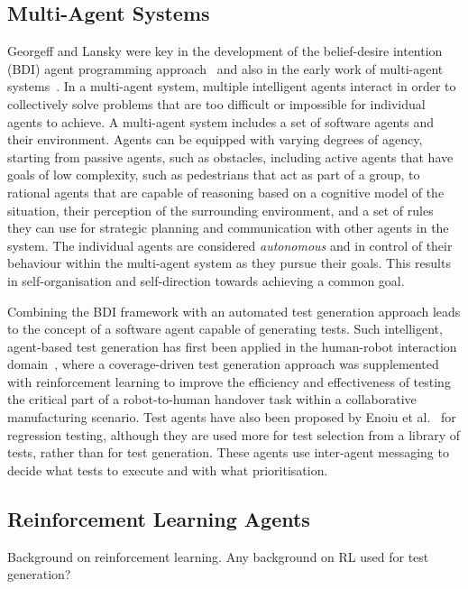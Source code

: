 \documentclass[letterpaper, 10 pt, journal, twoside]{IEEEtran}
\begin{document}
\subsection{Multi-Agent Systems}
Georgeff and Lansky were key in the development of the belief-desire intention (BDI) agent programming approach~\cite{georgeff1987reactive} and also in the early work of multi-agent systems~\cite{georgeff1988communication}. In a multi-agent system, multiple intelligent agents interact in order to collectively solve problems that are too difficult or impossible for individual agents to achieve. A multi-agent system includes a set of software agents and their environment. Agents can be equipped with varying degrees of agency, starting from  passive agents, such as obstacles, including active agents that have goals of low complexity, such as pedestrians that act as part of a group, to rational agents that are capable of reasoning based on a cognitive model of the situation, their perception of the surrounding environment, and a set of rules they can use for strategic planning and communication with other agents in the system. The individual agents are considered \textit{autonomous} and in control of their behaviour within the multi-agent system as they pursue their goals. This results in self-organisation and self-direction towards achieving a common goal. 

Combining the BDI framework with an automated test generation approach leads to the concept of a software agent capable of generating tests.
Such intelligent, agent-based test generation has first been applied in the human-robot interaction domain~\cite{Araiza-Illan2016}, where a coverage-driven test generation approach was supplemented with reinforcement learning to improve the efficiency and effectiveness of testing the critical part of a robot-to-human handover task within a collaborative manufacturing scenario. Test agents have also been proposed by Enoiu et al.~\cite{Enoiu2019} for regression testing, although they are used more for test selection from a library of tests, rather than for test generation. These agents use inter-agent messaging to decide what tests to execute and with what prioritisation.

\subsection{Reinforcement Learning Agents}
Background on reinforcement learning.
Any background on RL used for test generation?


\end{document}
